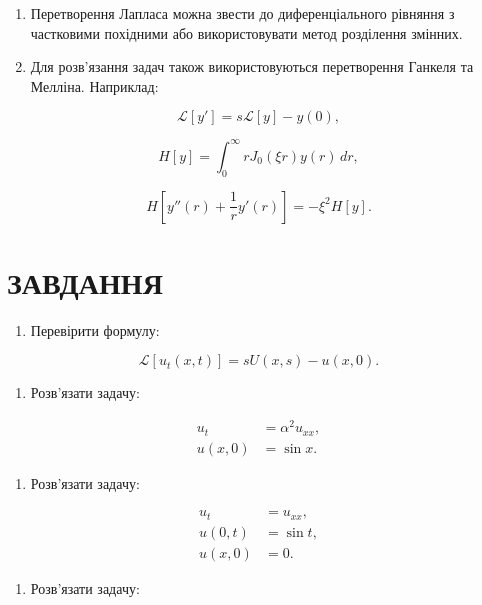 \documentclass[
  ukrainian,
]{article}
\providecommand{\tightlist}{%
  \setlength{\itemsep}{0pt}\setlength{\parskip}{0pt}}
\begin{document}
\begin{enumerate}
\def\labelenumi{\arabic{enumi}.}
\item
  Перетворення Лапласа можна звести до диференціального рівняння з
  частковими похідними або використовувати метод розділення змінних.
\item
  Для розв'язання задач також використовуються перетворення Ганкеля та
  Мелліна. Наприклад:
\end{enumerate}

\[
\mathscr{L}[y'] = s\mathscr{L}[y] - y(0),
\]

\[
H[y] = \int_{0}^{\infty} r J_0(\xi r) y(r)\,dr,
\]

\[
H\left[y''(r)+\frac{1}{r}y'(r)\right] = -\xi^2 H[y].
\]

\section{ЗАВДАННЯ}\label{ux437ux430ux432ux434ux430ux43dux43dux44f-10}

\begin{enumerate}
\def\labelenumi{\arabic{enumi}.}
\tightlist
\item
  Перевірити формулу:
\end{enumerate}

\[
\mathscr{L}[u_t(x,t)] = sU(x,s) - u(x,0).
\]

\begin{enumerate}
\def\labelenumi{\arabic{enumi}.}
\setcounter{enumi}{1}
\tightlist
\item
  Розв'язати задачу:
\end{enumerate}

\[
\begin{aligned}
u_t &= \alpha^2 u_{xx}, \\
u(x,0) &= \sin x.
\end{aligned}
\]

\begin{enumerate}
\def\labelenumi{\arabic{enumi}.}
\setcounter{enumi}{2}
\tightlist
\item
  Розв'язати задачу:
\end{enumerate}

\[
\begin{aligned}
u_t &= u_{xx}, \\
u(0,t) &= \sin t, \\
u(x,0) &= 0.
\end{aligned}
\]

\begin{enumerate}
\def\labelenumi{\arabic{enumi}.}
\setcounter{enumi}{3}
\tightlist
\item
  Розв'язати задачу:
\end{enumerate}
\end{document}
